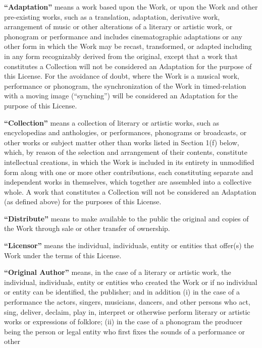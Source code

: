 \begin{doclicense@enumerate}
\item \textbf{``Adaptation''} means a work based upon
the Work, or upon the Work and other pre-existing works,
such as a translation, adaptation, derivative work,
arrangement of music or other alterations of a literary
or artistic work, or phonogram or performance and
includes cinematographic adaptations or any other form in
which the Work may be recast, transformed, or adapted
including in any form recognizably derived from the
original, except that a work that constitutes a
Collection will not be considered an Adaptation for the
purpose of this License. For the avoidance of doubt,
where the Work is a musical work, performance or
phonogram, the synchronization of the Work in
timed-relation with a moving image (``synching'') will be
considered an Adaptation for the purpose of this
License.
\item \textbf{``Collection''} means a collection of
literary or artistic works, such as encyclopedias and
anthologies, or performances, phonograms or broadcasts,
or other works or subject matter other than works listed
in Section 1(f) below, which, by reason of the selection
and arrangement of their contents, constitute
intellectual creations, in which the Work is included in
its entirety in unmodified form along with one or more
other contributions, each constituting separate and
independent works in themselves, which together are
assembled into a collective whole. A work that
constitutes a Collection will not be considered an
Adaptation (as defined above) for the purposes of this
License.
\item \textbf{``Distribute''} means to make available
to the public the original and copies of the Work through
sale or other transfer of ownership.
\item \textbf{``Licensor''} means the individual,
individuals, entity or entities that offer(s) the Work
under the terms of this License.
\item \textbf{``Original Author''} means, in the case
of a literary or artistic work, the individual,
individuals, entity or entities who created the Work or
if no individual or entity can be identified, the
publisher; and in addition (i) in the case of a
performance the actors, singers, musicians, dancers, and
other persons who act, sing, deliver, declaim, play in,
interpret or otherwise perform literary or artistic works
or expressions of folklore; (ii) in the case of a
phonogram the producer being the person or legal entity
who first fixes the sounds of a performance or other

\end{doclicense@enumerate}
